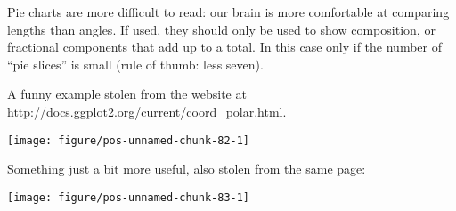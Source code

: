 \documentclass[paper=a4,10pt,div=17,headsepline,BCOR=12mm,twoside,open=right]{scrbook}\usepackage{knitr}
\begin{document}
Pie charts are more difficult to read: our brain is more comfortable at comparing
lengths than angles. If used, they should only be used to show composition, or
fractional components that add up to a total. In this case only if the number of
“pie slices” is small (rule of thumb: less seven).

A funny example stolen from the \ggplot website at \url{http://docs.ggplot2.org/current/coord_polar.html}.

\begin{knitrout}\footnotesize
{}\color{fgcolor}\begin{kframe}
\begin{alltt}
 \hlkwb{<-} \hlstd{(}
   \hlstd{=} \hlstd{(}\hlstd{,} \hlstd{),}
   \hlstd{=} \hlstd{(}\hlstd{,} \hlstd{)}
\hlstd{)}
 \hlstd{(} \hlstd{=} \hlstd{,}     \hlopt{+}
  \hlstd{(} \hlstd{=} \hlstd{,}  \hlstd{=} \hlstd{)} \hlopt{+}
  \hlstd{(} \hlstd{=} \hlstd{(}\hlstd{,} \hlstd{))} \hlopt{+}
  \hlstd{(}\hlstd{,}   \hlopt{/} \hlstd{)} \hlopt{+}
  \hlstd{(} \hlstd{=} \hlstd{)}
\end{alltt}
\end{kframe}

{\centering \texttt{[image: figure/pos-unnamed-chunk-82-1]} 

}



\end{knitrout}

Something just a bit more useful, also stolen from the same page:

\begin{knitrout}\footnotesize
{}\color{fgcolor}\begin{kframe}
\begin{alltt}
 \hlkwb{<-} \hlstd{(}  \hlstd{(} \hlstd{=} \hlstd{(}\hlstd{),}  \hlstd{=}  \hlopt{+}
         \hlstd{(} \hlstd{=} \hlstd{)}
 \hlopt{+} \hlstd{(} \hlstd{=} \hlstd{)}
\end{alltt}
\end{kframe}

{\centering \texttt{[image: figure/pos-unnamed-chunk-83-1]} 

}



\end{knitrout}
\end{document}
